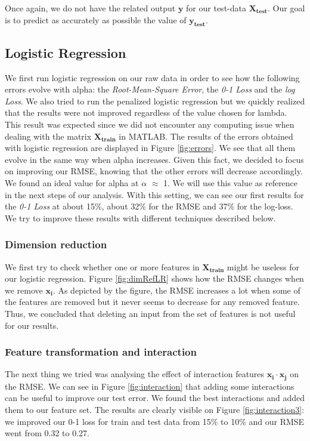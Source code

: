 \documentclass{article} %
\begin{document}
Once again, we do not have the related output $\mathbf{y}$ for our test-data $\mathbf{X_{test}}$. Our goal is to predict as accurately as possible the value of $\mathbf{y_{test}}$.

\subsection{Logistic Regression}
We first run logistic regression on our raw data in order to see how the following errors evolve with alpha: the \textit{Root-Mean-Square Error}, the \textit{0-1 Loss} and the \textit{log Loss}. We also tried to run the penalized logistic regression but we quickly realized that the results were not improved regardless of the value chosen for lambda. This result was expected since we did not encounter any computing issue when dealing with the matrix $\mathbf{X_{train}}$ in MATLAB. The results of the errors obtained with logistic regression are displayed in Figure \ref{fig:errors}. We see that all them evolve in the same way when alpha increases. Given this fact, we decided to focus on improving our RMSE, knowing that the other errors will decrease accordingly. We found an ideal value for alpha at $\alpha$ $\approx$ 1. We will use this value as reference in the next steps of our analysis. With this setting, we can see our first results for the \textit{0-1 Loss} at about 15\%, about 32\% for the RMSE and 37\% for the log-loss. We try to improve these results with different techniques described below.

\subsubsection{Dimension reduction}
We first try to check whether one or more features in $\mathbf{X_{train}}$ might be useless for our logistic regression. Figure \ref{fig:dimRefLR} shows how the RMSE changes when we remove $\mathbf{x_{i}}$. As depicted by the figure, the RMSE increases a lot when some of the features are removed but it never seems to decrease for any removed feature. Thus, we concluded that deleting an input from the set of features is not useful for our results.

\clearpage
\subsubsection{Feature transformation and interaction}
The next thing we tried was analysing the effect of interaction features $\mathbf{x_{i} \cdot x_{j}}$ on the RMSE. We can see in Figure \ref{fig:interaction} that adding some interactions can be useful to improve our test error. We found the best interactions and added them to our feature set. The results are clearly visible on Figure \ref{fig:interaction3}: we improved our 0-1 loss for train and test data from 15\% to 10\% and our RMSE went from 0.32 to 0.27.
\end{document}
